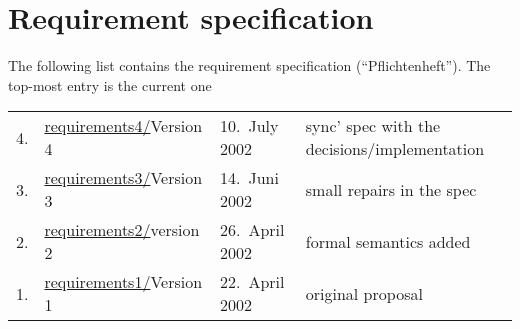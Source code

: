 
\section*{Requirement specification}
\label{sec:requirement specification}

The following list contains the requirement specification
(``Pflichtenheft''). The top-most entry is the current one

\begin{center}
  \begin{tabular}[t]{r@{\quad}l@{\quad\quad}l@{\quad\quad}p{9cm}}
    4.
    & 
    \url{requirements4/}{Version 4}
    &
    10.\ July 2002
    & 
    sync' spec with the decisions/implementation
    \\
    3.
    & 
    \url{requirements3/}{Version 3}
    &
    14.\ Juni 2002
    & 
    small repairs in the spec
    \\
    2.
    & 
    \url{requirements2/}{version 2}
    &
    26.\ April 2002
    & 
    formal semantics added
    \\
    1.
    & 
    \url{requirements1/}{Version 1}
    &
    22.\ April 2002
    & 
    original proposal
  \end{tabular}
\end{center}




